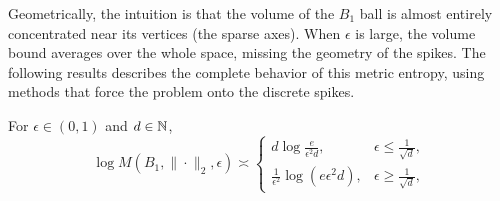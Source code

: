 Geometrically, the intuition is that the volume of the $B_1$ ball is almost entirely concentrated near its vertices (the sparse axes).
When $\epsilon$ is large, the volume bound averages over the whole space, missing the geometry of the spikes.
The following results describes the complete behavior of this metric entropy, using methods that force the problem onto the discrete spikes.


\begin{theorem}
    For $\epsilon\in(0,1)$ and $d\in\mathbb{N}$,
    \[\log M(B_1,\|\cdot\|_2,\epsilon)\asymp \begin{cases}
d\log\frac{e}{\epsilon^2d}, &\epsilon \leq \frac{1}{\sqrt{d} } ,  \\
\frac{1}{\epsilon^2}\log(e\epsilon^2 d),&\epsilon \geq \frac{1}{\sqrt{d} }  ,
\end{cases}\]
\end{theorem}



